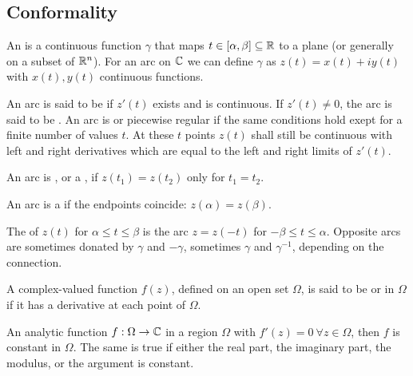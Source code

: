 \subsection{Conformality}

\begin{definition}[Arc]
    An  is a continuous function $\gamma$ that maps $t \in [\alpha,\beta]
    \subseteq \mathbb{R}$ to a plane (or generally on a subset of $\mathbb{R}^n$). For an arc on $\mathbb{C}$
    we can define $\gamma$ as $z(t) = x(t) + i y(t)$ with $x(t),y(t)$ continuous
    functions.
\end{definition}

\begin{definition}
    An arc is said to be  if $z'(t)$ exists and is continuous.
    If $z'(t) \neq 0$, the arc is said to be . An arc is  or {piecewise regular} if the same conditions hold exept for a
    finite number of values $t$. At these $t$ points $z(t)$ shall still be continuous
    with left and right derivatives which are equal to the left and right limits of
    $z'(t)$.
\end{definition}

\begin{definition}
    An arc is , or a , if $z(t_1) = z(t_2)$ only for
    $t_1 = t_2$.
\end{definition}

\begin{definition}
    An arc is a  if the endpoints coincide: $z(\alpha) = z(\beta)$.
\end{definition}

\begin{definition}
    The  of $z(t)$ for $\alpha \leq t \leq \beta$ is the arc
    $z = z(-t)$ for $-\beta \leq t \leq \alpha$. Opposite arcs are sometimes donated by
    $\gamma$ and $-\gamma$, sometimes $\gamma$ and $\gamma^{-1}$, depending on the
    connection.
\end{definition}

\begin{definition}
    A complex-valued function $f(z)$, defined on an open set $\Omega$, is said to be
     or  in $\Omega$ if it has a derivative at each
    point of $\Omega$.
\end{definition}

\begin{theorem}
    An analytic function $f: \Omega \rightarrow \mathbb{C}$ in a region $\Omega$ with
    $f'(z) = 0 \ \forall z \in \Omega$, then $f$ is constant in $\Omega$. The same
    is true if either the real part, the imaginary part, the modulus, or the argument
    is constant.
\end{theorem}

